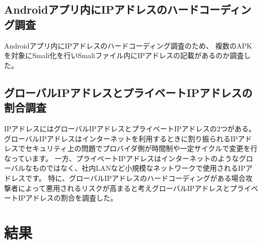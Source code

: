 \documentclass[a4j]{jarticle}
\begin{document}
\subsection{Androidアプリ内にIPアドレスのハードコーディング調査}
Androidアプリ内にIPアドレスのハードコーディング調査のため、
複数のAPKを対象にSmali化を行いSmaliファイル内にIPアドレスの記載があるのか調査した。
\subsection{グローバルIPアドレスとプライベートIPアドレスの割合調査}
IPアドレスにはグローバルIPアドレスとプライベートIPアドレスの2つがある。
グローバルIPアドレスはインターネットを利用するときに割り振られるIPアドレスでセキュリティ上の問題でプロバイダ側が時間制や一定サイクルで変更を行なっています。
一方、プライベートIPアドレスはインターネットのようなグローバルなものではなく、社内LANなど小規模なネットワークで使用されるIPアドレスです。
特に、グローバルIPアドレスのハードコーディングがある場合攻撃者によって悪用されるリスクが高まると考えグローバルIPアドレスとプライベートIPアドレスの割合を調査した。

\newpage
\section{結果}
\end{document}

